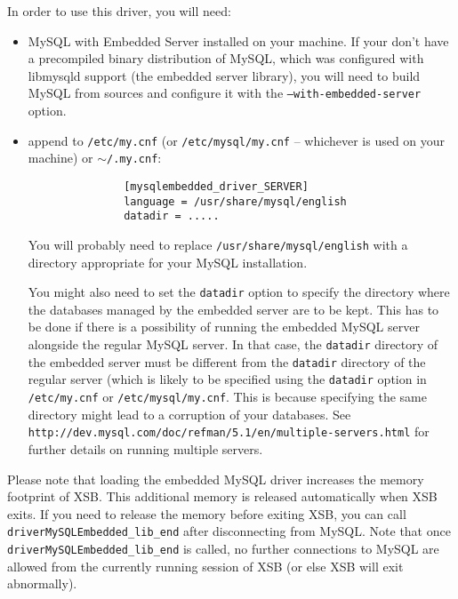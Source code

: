 \noindent
In order to use this driver, you will need:
\begin{itemize}
 \item MySQL with Embedded Server installed on your machine. If your don't
 have a precompiled binary distribution of MySQL, which was configured with
 libmysqld support (the embedded server library), you will need to build
 MySQL from sources and configure it with the {\tt --with-embedded-server} option.

 \item append to {\tt /etc/my.cnf} (or {\tt /etc/mysql/my.cnf} -- whichever
   is used on your machine) or $\sim${\tt/.my.cnf}:
       \begin{verbatim}
               [mysqlembedded_driver_SERVER]
               language = /usr/share/mysql/english
               datadir = ..... 
       \end{verbatim}
       You will probably need to replace
       {\tt /usr/share/mysql/english} with a directory
       appropriate for your MySQL installation.

       You might also need to set the {\tt datadir} option to specify
       the directory where the databases managed by the embedded server are
       to be kept. This has to be done if there is a possibility of running
       the embedded MySQL server alongside the regular MySQL server. In
       that case, the {\tt datadir} directory of the embedded server must
       be different from the {\tt datadir} directory of the regular server
       (which is likely to be specified using the {\tt datadir} option in
       {\tt /etc/my.cnf} or {\tt /etc/mysql/my.cnf}. This is because
       specifying the same directory might lead to a corruption of your
       databases. See {\tt
         http://dev.mysql.com/doc/refman/5.1/en/multiple-servers.html} for
       further details on running multiple servers.
\end{itemize}

Please note that loading the embedded MySQL driver increases the memory
footprint of XSB. This additional memory is released automatically when XSB
exits. If you need to release the memory before exiting XSB, you can call {\tt
  driverMySQLEmbedded\_lib\_end} after disconnecting from MySQL.  Note
that once {\tt driverMySQLEmbedded\_lib\_end} is called, no further
connections to MySQL are allowed from the currently running session of XSB
(or else XSB will exit abnormally).



